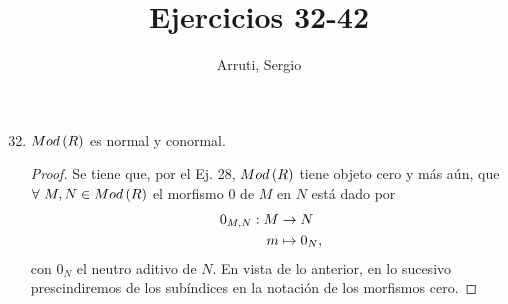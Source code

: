 \documentclass{article}
\title{Ejercicios 32-42}
\author{Arruti, Sergio}
\date{}
\begin{document}
	\maketitle
	\begin{enumerate}[label=\textbf{Ej \arabic*.}]
		\setcounter{enumi}{31}
		\item $Mod\left(R\right)$ es normal y conormal.
		\begin{proof}
			Se tiene que, por el Ej. 28, $Mod\left(R\right)$ tiene objeto cero y más aún, que $\forall\ M,N\in Mod\left(R\right)$ el morfismo $0$ de $M$ en $N$ está dado por
			\begin{align*}
				0_{M,N}: M &\rightarrow N\\ m &\mapsto 0_N,
			\end{align*} con $0_N$ el neutro aditivo de $N$. En vista de lo anterior, en lo sucesivo prescindiremos de los subíndices en la notación de los morfismos cero.
			

\end{proof}
\end{enumerate}
\end{document}
